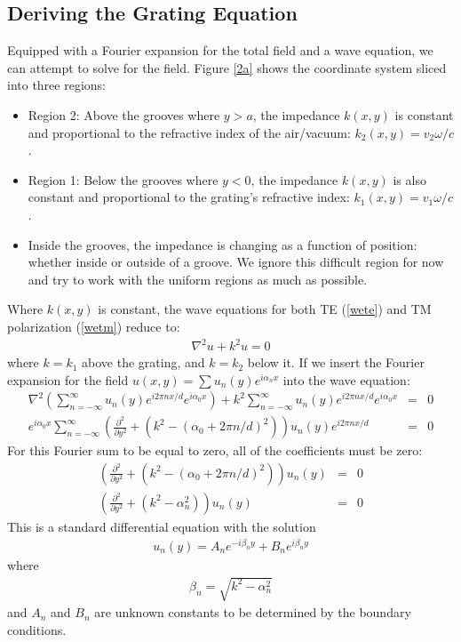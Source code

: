 \subsection{Deriving the Grating Equation}
Equipped with a Fourier expansion for the total field and a wave equation, we can attempt to solve for the field.  Figure \ref{2a} shows the coordinate system sliced into three regions: 
\begin{itemize}
\item Region 2: Above the grooves where $y>a$, the impedance $k(x, y)$ is constant and proportional to the refractive index of the air/vacuum: $k_2(x, y)=v_2 \omega/c$.
\item Region 1: Below the grooves where $y<0$, the impedance $k(x,y)$ is also constant and proportional to the grating's refractive index: $k_1(x,y)=v_1 \omega /c$.
\item Inside the grooves, the impedance is changing as a function of position: whether inside or outside of a groove.  We ignore this difficult region for now and try to work with the uniform regions as much as possible.
\end{itemize}
Where $k(x,y)$ is constant, the wave equations for both TE (\ref{wete}) and TM polarization (\ref{wetm}) reduce to:
\begin{eqnarray}
\nabla^2 u + k^2 u = 0
\end{eqnarray}
where $k=k_1$ above the grating, and $k=k_2$ below it.  If we insert the Fourier expansion for the field $u(x,y)=\sum u_n(y) e^{i\alpha_n x}$ into the wave equation:
\begin{eqnarray}
\nabla^2 \left( \sum_{n=-\infty}^{\infty} u_n(y) e^{i2\pi nx/d}e^{i\alpha_0 x} \right) + k^2 \sum_{n=-\infty}^{\infty} u_n(y) e^{i2\pi n x/d}e^{i\alpha_0 x} &=& 0 \\
e^{i \alpha_0 x} \sum_{n=-\infty}^{\infty}  \left( \frac{\partial^2}{\partial y^2} + (k^2 - (\alpha_0+2\pi n/d)^2) \right) u_n(y) e^{i2\pi n x/d} &=& 0
\end{eqnarray}
For this Fourier sum to be equal to zero, all of the coefficients must be zero:
\begin{eqnarray}
\left( \frac{\partial^2}{\partial y^2} + (k^2 - (\alpha_0+2\pi n/d)^2) \right) u_n(y) &=& 0\\
\left( \frac{\partial^2}{\partial y^2} + (k^2 - \alpha_n^2) \right) u_n(y) &=& 0
\end{eqnarray}
This is a standard differential equation with the solution
\begin{eqnarray}
u_n(y) = A_n e^{-i\beta_n y}+ B_n e^{i\beta_n y}
\end{eqnarray}
where 
\begin{eqnarray}
\beta_n = \sqrt{k^2 - \alpha_n^2}
\end{eqnarray}
and $A_n$ and $B_n$ are unknown constants to be determined by the boundary conditions.


